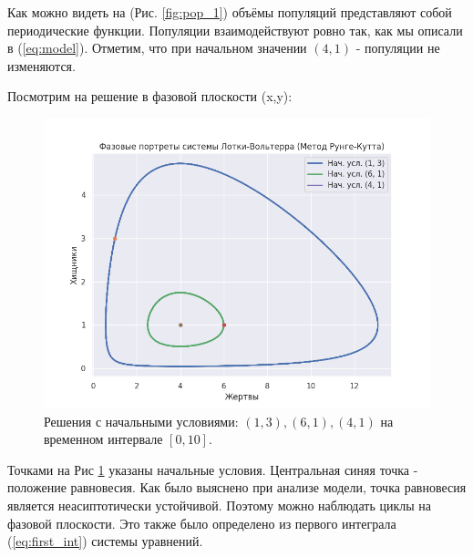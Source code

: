 Как можно видеть на (Рис. \ref{fig:pop_1}) объёмы популяций представляют собой периодические функции. Популяции взаимодействуют ровно так, как мы описали в (\ref{eq:model}). Отметим, что при начальном значении $(4,1)$ - популяции не изменяются.

Посмотрим на решение в фазовой плоскости (x,y):
\begin{figure}[h]  %
	\centering
	\includegraphics[width=1\textwidth]{imgs/phase_1.png}  %
	\caption{Решения с начальными условиями: $(1,3), (6,1),(4,1)$ на временном интервале $[0,10]$.}  %
	\label{fig:phase_1}  %
\end{figure}

Точками на Рис \ref{fig:phase_1} указаны начальные условия. Центральная синяя точка - положение равновесия. Как было выяснено при анализе модели, точка равновесия является неасиптотически устойчивой. Поэтому можно наблюдать циклы на фазовой плоскости. Это также было определено из первого интеграла (\ref{eq:first_int}) системы уравнений.

